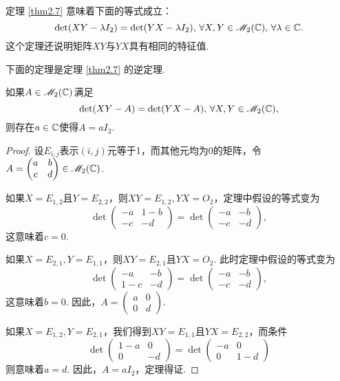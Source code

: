\begin{nota}
  定理 \ref{thm2.7} 意味着下面的等式成立：
  \[
    \det (XY - \lambda I_2) = \det(YX - \lambda I_2),\,\forall X,Y\in\mathscr M_2(\mathbb C),\,\forall \lambda\in\mathbb C.
  \]
  这个定理还说明矩阵$XY$与$YX$具有相同的特征值.
\end{nota}

下面的定理是定理 \ref{thm2.7} 的逆定理.

\begin{theorem}
  如果$A\in\mathscr M_2(\mathbb C)$满足
  \[
    \det (XY - A) = \det(YX - A),\,\forall X,Y\in\mathscr M_2(\mathbb C),
  \]
  则存在$a\in\mathbb C$使得$A=aI_2$.
\end{theorem}

\begin{proof}
  设$E_{i,j}$表示$(i,j)$元等于1，而其他元均为0的矩阵，令$A=\begin{pmatrix}
    a & b \\
    c & d
  \end{pmatrix}\in\mathscr M_2(\mathbb C)$.

  如果$X=E_{1,2}$且$Y=E_{2,2}$，则$XY=E_{1,2},YX=O_2$，定理中假设的等式变为
  \[
    \det \begin{pmatrix}
      -a & 1 - b \\
      -c & -d
    \end{pmatrix} = \det
    \begin{pmatrix}
      -a & -b \\
      -c & -d
    \end{pmatrix},
  \]
  这意味着$c=0$.

  如果$X=E_{2,1},Y=E_{1,1}$，则$XY=E_{2,1}$且$YX=O_2$. 此时定理中假设的等式变为
  \[
    \det \begin{pmatrix}
      -a & -b \\
      1 - c & -d
    \end{pmatrix} = \det \begin{pmatrix}
      -a & -b \\
      -c & -d
    \end{pmatrix},
  \]
  这意味着$b=0$. 因此，$A=\begin{pmatrix}
    a & 0 \\
    0 & d
  \end{pmatrix}$.

  如果$X=E_{1,2},Y=E_{2,1}$，我们得到$XY=E_{1,1}$且$YX=E_{2,2}$，而条件
  \[
    \det \begin{pmatrix}
      1 - a & 0 \\
      0 & -d
    \end{pmatrix} = \det \begin{pmatrix}
      -a & 0 \\
      0 & 1 - d
    \end{pmatrix}
  \]
  则意味着$a=d$. 因此，$A=aI_2$，定理得证.
\end{proof}

